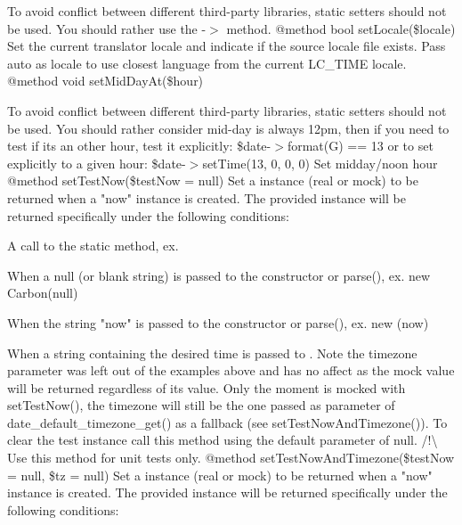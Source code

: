 \begin{DoxyRefList}
To avoid conflict between different third-\/party libraries, static setters should not be used. You should rather use the -\/\texorpdfstring{$>$}{>} method. @method bool set\+Locale(\$locale) Set the current translator locale and indicate if the source locale file exists. Pass \textquotesingle{}auto\textquotesingle{} as locale to use closest language from the current LC\+\_\+\+TIME locale. @method void set\+Mid\+Day\+At(\$hour) 



To avoid conflict between different third-\/party libraries, static setters should not be used. You should rather consider mid-\/day is always 12pm, then if you need to test if it\textquotesingle{}s an other hour, test it explicitly\+: \$date-\/\texorpdfstring{$>$}{>}format(\textquotesingle{}G\textquotesingle{}) == 13 or to set explicitly to a given hour\+: \$date-\/\texorpdfstring{$>$}{>}set\+Time(13, 0, 0, 0) Set midday/noon hour @method  set\+Test\+Now(\$test\+Now = null) Set a  instance (real or mock) to be returned when a "{}now"{} instance is created. The provided instance will be returned specifically under the following conditions\+:
\begin{DoxyItemize}
\item A call to the static  method, ex. 
\item When a null (or blank string) is passed to the constructor or parse(), ex. new Carbon(null)
\item When the string "{}now"{} is passed to the constructor or parse(), ex. new (\textquotesingle{}now\textquotesingle{})
\item When a string containing the desired time is passed to . Note the timezone parameter was left out of the examples above and has no affect as the mock value will be returned regardless of its value. Only the moment is mocked with set\+Test\+Now(), the timezone will still be the one passed as parameter of date\+\_\+default\+\_\+timezone\+\_\+get() as a fallback (see set\+Test\+Now\+And\+Timezone()). To clear the test instance call this method using the default parameter of null. /!\textbackslash{} Use this method for unit tests only. @method  set\+Test\+Now\+And\+Timezone(\$test\+Now = null, \$tz = null) Set a  instance (real or mock) to be returned when a "{}now"{} instance is created. The provided instance will be returned specifically under the following conditions\+:

\end{DoxyItemize}
\end{DoxyRefList}
